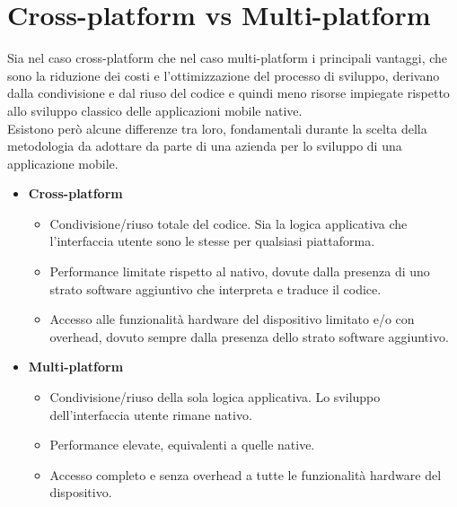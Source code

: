 \section{Cross-platform vs Multi-platform}
Sia nel caso cross-platform che nel caso multi-platform i principali vantaggi, che sono la riduzione dei costi e l'ottimizzazione del processo di sviluppo, derivano dalla condivisione e dal riuso del codice e quindi meno risorse impiegate rispetto allo sviluppo classico delle applicazioni mobile native.\\
Esistono però alcune differenze tra loro, fondamentali durante la scelta della metodologia da adottare da parte di una azienda per lo sviluppo di una applicazione mobile.
\begin{itemize}
    \item \textbf{Cross-platform}
    \begin{itemize}
        \item Condivisione/riuso totale del codice. Sia la logica applicativa che l'interfaccia utente sono le stesse per qualsiasi piattaforma.
        \item Performance limitate rispetto al nativo, dovute dalla presenza di uno strato software aggiuntivo che interpreta e traduce il codice.
        \item Accesso alle funzionalità hardware del dispositivo limitato e/o con overhead, dovuto sempre dalla presenza dello strato software aggiuntivo.
    \end{itemize}
    \item \textbf{Multi-platform}
    \begin{itemize}
        \item Condivisione/riuso della sola logica applicativa. Lo sviluppo dell'interfaccia utente rimane nativo.
        \item Performance elevate, equivalenti a quelle native.
        \item Accesso completo e senza overhead a tutte le funzionalità hardware del dispositivo.
    \end{itemize}
\end{itemize}

